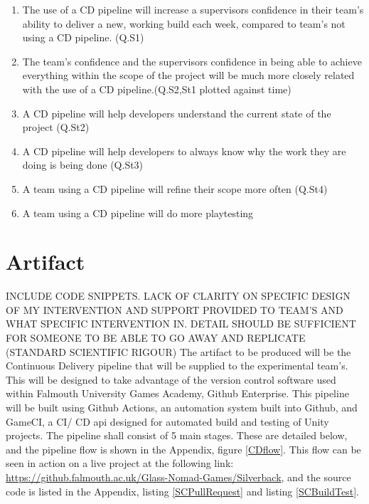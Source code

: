 \documentclass[journal]{IEEEtran}
\begin{document}
\begin{enumerate}
    \item \label{h_supconfidence} The use of a CD pipeline will increase a supervisors confidence in their team's ability to deliver a new, working build each week, compared to team's not using a CD pipeline. (Q.S1)
    \item \label{h_supteamconfidence} The team's confidence and the supervisors confidence in being able to achieve everything within the scope of the project will be much more closely related with the use of a CD pipeline.(Q.S2,St1 plotted against time)
    \item \label{h_projectstate} A CD pipeline will help developers understand the current state of the project (Q.St2)
    \item \label{h_workreason} A CD pipeline will help developers to always know why the work they are doing is being done (Q.St3)
    \item \label{h_scoperefine} A team using a CD pipeline will refine their scope more often (Q.St4)
    \item \label{h_playtesting} A team using a CD pipeline will do more playtesting
\end{enumerate}

\section{Artifact}
INCLUDE CODE SNIPPETS. LACK OF CLARITY ON SPECIFIC DESIGN OF MY INTERVENTION AND SUPPORT PROVIDED TO TEAM'S AND WHAT SPECIFIC INTERVENTION IN. DETAIL SHOULD BE SUFFICIENT FOR SOMEONE TO BE ABLE TO GO AWAY AND REPLICATE (STANDARD SCIENTIFIC RIGOUR)
The artifact to be produced will be the Continuous Delivery pipeline that will be supplied to the experimental team's. This will be designed to take advantage of the version control software used within Falmouth University Games Academy, Github Enterprise\cite{gitenterprise}. This pipeline will be built using Github Actions\cite{gitactions}, an automation system built into Github, and GameCI\cite{gameci}, a CI/ CD api designed for automated build and testing of Unity projects. The pipeline shall consist of 5 main stages. These are detailed below, and the pipeline flow is shown in the Appendix, figure \ref{CDflow}. This flow can be seen in action on a live project at the following link: \url{https://github.falmouth.ac.uk/Glass-Nomad-Games/Silverback}, and the source code is listed in the Appendix, listing \ref{SCPullRequest} and listing \ref{SCBuildTest}.\\
\end{document}
